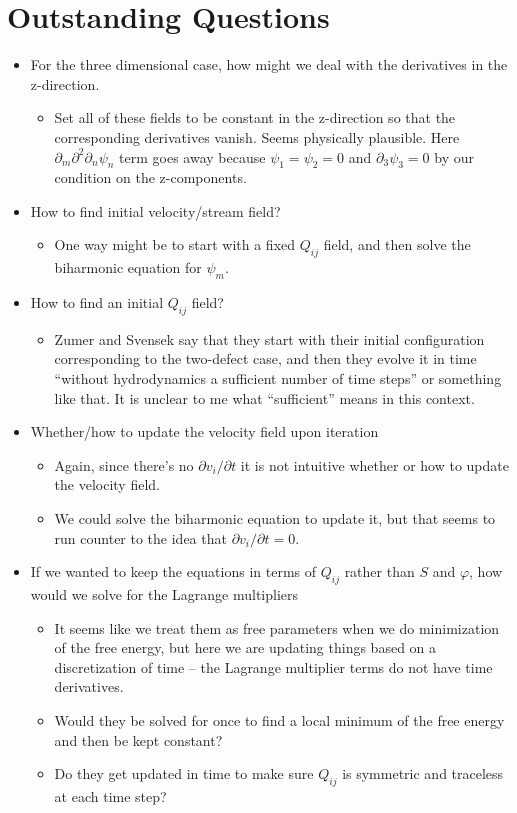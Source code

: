 \documentclass[reqno]{article}
\begin{document}
	\section*{Outstanding Questions}
	\begin{itemize}
		\item For the three dimensional case, how might we deal with the derivatives in the z-direction. 
		\begin{itemize}
			\item Set all of these fields to be constant in the z-direction so that the corresponding derivatives vanish. Seems physically plausible. Here $\partial_m\partial^2\partial_n\psi_n$ term goes away because $\psi_1 = \psi_2 = 0$ and $\partial_3 \psi_3 = 0$ by our condition on the z-components.
		\end{itemize}
		
		\item How to find initial velocity/stream field?
		\begin{itemize}
			\item One way might be to start with a fixed $Q_{ij}$ field, and then solve the biharmonic equation for $\psi_m$.
		\end{itemize}
	
		\item How to find an initial $Q_{ij}$ field?
		\begin{itemize}
			\item Zumer and Svensek say that they start with their initial configuration corresponding to the two-defect case, and then they evolve it in time ``without hydrodynamics a sufficient number of time steps'' or something like that. It is unclear to me what ``sufficient'' means in this context.
		\end{itemize}
		
		\item Whether/how to update the velocity field upon iteration
		\begin{itemize}
			\item Again, since there's no $\partial v_i/\partial t$ it is not intuitive whether or how to update the velocity field. 
			\item We could solve the biharmonic equation to update it, but that seems to run counter to the idea that $\partial v_i/\partial t = 0$. 
		\end{itemize}
		
		\item If we wanted to keep the equations in terms of $Q_{ij}$ rather than $S$ and $\varphi$, how would we solve for the Lagrange multipliers
		\begin{itemize}
			\item It seems like we treat them as free parameters when we do minimization of the free energy, but here we are updating things based on a discretization of time -- the Lagrange multiplier terms do not have time derivatives. 
			\item Would they be solved for once to find a local minimum of the free energy and then be kept constant?
			\item Do they get updated in time to make sure $Q_{ij}$ is symmetric and traceless at each time step?
		\end{itemize}
		

\end{itemize}
\end{document}
